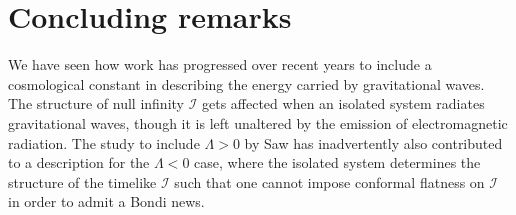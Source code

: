 \documentclass[aps,pre,preprint,superscriptaddress,showpacs,showkeys]{revtex4-1}
\begin{document}
%
%

\section{Concluding remarks}\label{Section5}

We have seen how work has progressed over recent years to include a cosmological constant in describing the energy carried by gravitational waves. The structure of null infinity $\mathcal{I}$ gets affected when an isolated system radiates gravitational waves, though it is left unaltered by the emission of electromagnetic radiation. The study to include $\Lambda>0$ by Saw \cite{Vee2016,Vee2017,Vee2017c} has inadvertently also contributed to a description for the $\Lambda<0$ case, where the isolated system determines the structure of the timelike $\mathcal{I}$ such that one cannot impose conformal flatness on $\mathcal{I}$ in order to admit a Bondi news.
\end{document}
